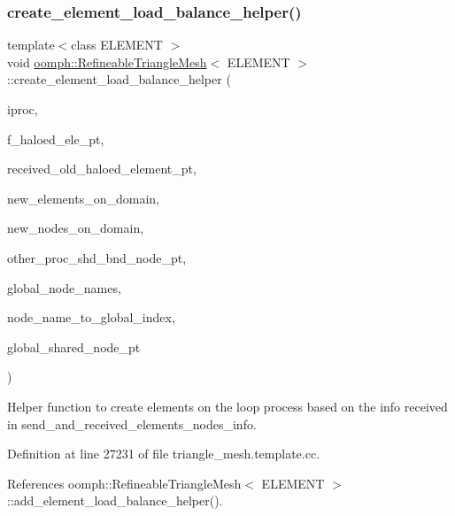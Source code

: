 \subsubsection{\texorpdfstring{create\+\_\+element\+\_\+load\+\_\+balance\+\_\+helper()}{create\_element\_load\_balance\_helper()}}
{\footnotesize\ttfamily template$<$class E\+L\+E\+M\+E\+NT $>$ \\
void \hyperlink{classoomph_1_1RefineableTriangleMesh}{oomph\+::\+Refineable\+Triangle\+Mesh}$<$ E\+L\+E\+M\+E\+NT $>$\+::create\+\_\+element\+\_\+load\+\_\+balance\+\_\+helper (\begin{DoxyParamCaption}\item[{unsigned \&}]{iproc,  }\item[{Vector$<$ Vector$<$ Finite\+Element $\ast$$>$ $>$ \&}]{f\+\_\+haloed\+\_\+ele\+\_\+pt,  }\item[{Vector$<$ Vector$<$ std\+::map$<$ unsigned, Finite\+Element $\ast$$>$ $>$ $>$ \&}]{received\+\_\+old\+\_\+haloed\+\_\+element\+\_\+pt,  }\item[{Vector$<$ Finite\+Element $\ast$$>$ \&}]{new\+\_\+elements\+\_\+on\+\_\+domain,  }\item[{Vector$<$ Node $\ast$$>$ \&}]{new\+\_\+nodes\+\_\+on\+\_\+domain,  }\item[{Vector$<$ Vector$<$ Vector$<$ std\+::map$<$ unsigned, Node $\ast$$>$ $>$ $>$ $>$ \&}]{other\+\_\+proc\+\_\+shd\+\_\+bnd\+\_\+node\+\_\+pt,  }\item[{Vector$<$ Vector$<$ Vector$<$ unsigned $>$ $>$ $>$ \&}]{global\+\_\+node\+\_\+names,  }\item[{std\+::map$<$ Vector$<$ unsigned $>$, unsigned $>$ \&}]{node\+\_\+name\+\_\+to\+\_\+global\+\_\+index,  }\item[{Vector$<$ Node $\ast$$>$ \&}]{global\+\_\+shared\+\_\+node\+\_\+pt }\end{DoxyParamCaption})\hspace{0.3cm}{\ttfamily [protected]}}



Helper function to create elements on the loop process based on the info received in send\+\_\+and\+\_\+received\+\_\+elements\+\_\+nodes\+\_\+info. 



Definition at line 27231 of file triangle\+\_\+mesh.\+template.\+cc.



References oomph\+::\+Refineable\+Triangle\+Mesh$<$ E\+L\+E\+M\+E\+N\+T $>$\+::add\+\_\+element\+\_\+load\+\_\+balance\+\_\+helper().

